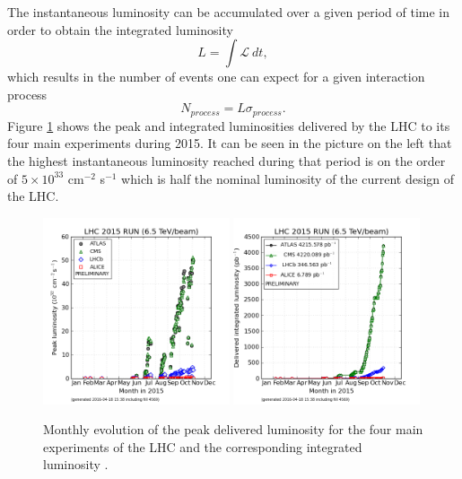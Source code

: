     The instantaneous luminosity can be accumulated over a given period of time in order to obtain the integrated luminosity
  	\begin{equation}
  		L = \int \mathcal{L} \ dt ,
  	\end{equation}
  	which results in the number of events one can expect for a given interaction process
  	\begin{equation}
  		N_{process} = L \sigma_{process} .
  	\end{equation}
    Figure \ref{fig:I-2-luminosity} shows the peak and integrated luminosities delivered by the LHC to its four main experiments during 2015. It can be seen in the picture on the left that the highest instantaneous luminosity reached during that period is on the order of $ 5 \times 10^{33} $ cm$^{-2}$ s$^{-1}$ which is half the nominal luminosity of the current design of the LHC.

		\begin{figure}[h!]
			\centering
			\includegraphics[width=0.49\textwidth]{img/I-2-LHC/luminosity-peak.png}
			\includegraphics[width=0.49\textwidth]{img/I-2-LHC/luminosity-integrated.png}
			\caption{Monthly evolution of the peak delivered luminosity for the four main experiments of the LHC and the corresponding integrated luminosity \cite{LUMI-PP-LPC}.}
			\label{fig:I-2-luminosity}
		\end{figure}


